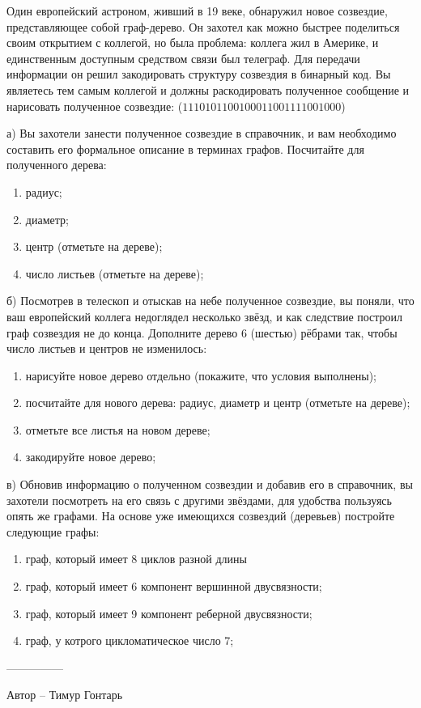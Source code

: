 \question
Один европейский астроном, живший в 19 веке, обнаружил новое созвездие, представляющее собой граф-дерево. Он захотел как можно быстрее поделиться своим открытием с коллегой, но была проблема: коллега жил в Америке, и единственным доступным средством связи был телеграф. Для передачи информации он решил закодировать структуру созвездия в бинарный код. Вы являетесь тем самым коллегой и должны раскодировать полученное сообщение и нарисовать полученное созвездие: ($1110101100100011001111001000$)

а) Вы захотели занести полученное созвездие в справочник, и вам необходимо составить его формальное описание в терминах графов. Посчитайте для полученного дерева:
\begin{enumerate}
\item радиус;
\item диаметр;
\item центр (отметьте на дереве);
\item число листьев (отметьте на дереве);
\end{enumerate}

б) Посмотрев в телескоп и отыскав на небе полученное созвездие, вы поняли, что ваш европейский коллега недоглядел несколько звёзд, и как следствие построил граф созвездия не до конца. Дополните дерево 6 (шестью) рёбрами так, чтобы число листьев и центров не изменилось:
\begin{enumerate}
\item нарисуйте новое дерево отдельно (покажите, что условия выполнены);
\item посчитайте для нового дерева: радиус, диаметр и центр (отметьте на дереве);
\item отметьте все листья на новом дереве;
\item закодируйте новое дерево;
\end{enumerate}

в) Обновив информацию о полученном созвездии и добавив его в справочник, вы захотели посмотреть на его связь с другими звёздами, для удобства пользуясь опять же графами. На основе уже имеющихся созвездий (деревьев) постройте следующие графы:
\begin{enumerate}
\item граф, который имеет 8 циклов разной длины
\item граф, который имеет 6 компонент вершинной двусвязности;
\item граф, который имеет 9 компонент реберной двусвязности;
\item граф, у котрого цикломатическое число 7;
\end{enumerate}

---------------

Автор -- Тимур Гонтарь
